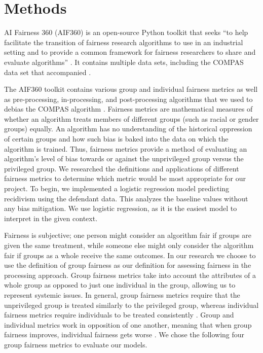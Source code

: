 \documentclass[water,article,submit,moreauthors,pdftex]{mdpi}
\begin{document}
\hypertarget{methods}{%
\section{Methods}\label{methods}}

AI Fairness 360 (AIF360) is an open-source Python toolkit that seeks
``to help facilitate the transition of fairness research algorithms to
use in an industrial setting and to provide a common framework for
fairness researchers to share and evaluate algorithms''
\citep{aif360-oct-2018}. It contains multiple data sets, including the
COMPAS data set that accompanied \citet{angwin2016machine}.

The AIF360 toolkit contains various group and individual fairness
metrics as well as pre-processing, in-processing, and post-processing
algorithms that we used to debias the COMPAS algorithm
\citep{aif360-oct-2018}. Fairness metrics are mathematical measures of
whether an algorithm treats members of different groups (such as racial
or gender groups) equally. An algorithm has no understanding of the
historical oppression of certain groups and how such bias is baked into
the data on which the algorithm is trained. Thus, fairness metrics
provide a method of evaluating an algorithm's level of bias towards or
against the unprivileged group versus the privileged group. We
researched the definitions and applications of different fairness
metrics \citep{ashokan2021fairness} to determine which metric would be
most appropriate for our project. To begin, we implemented a logistic
regression model predicting recidivism using the defendant data. This
analyzes the baseline values without any bias mitigation. We use
logistic regression, as it is the easiest model to interpret in the
given context.

Fairness is subjective; one person might consider an algorithm fair if
groups are given the same treatment, while someone else might only
consider the algorithm fair if groups as a whole receive the same
outcomes. In our research we choose to use the definition of group
fairness as our definition for assessing fairness in the processing
approach. Group fairness metrics take into account the attributes of a
whole group as opposed to just one individual in the group, allowing us
to represent systemic issues. In general, group fairness metrics require
that the unprivileged group is treated similarly to the privileged
group, whereas individual fairness metrics require individuals to be
treated consistently \citep{kypraiou_what_2021}. Group and individual
metrics work in opposition of one another, meaning that when group
fairness improves, individual fairness gets worse
\citep{kypraiou_what_2021}. We chose the following four group fairness
metrics to evaluate our models.
\end{document}

